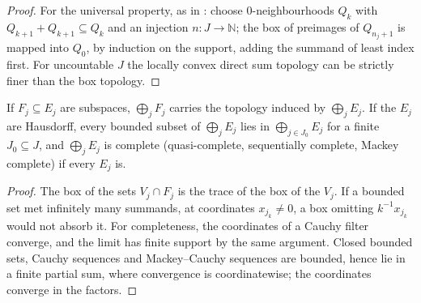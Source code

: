 \begin{proof}
  \leanok
  For the universal property, as in \cite[Lemma~B.13.2(a)]{GN26}: choose $0$-neighbourhoods $Q_k$
  with $Q_{k+1} + Q_{k+1} \subseteq Q_k$ and an injection $n \colon J \to \mathbb{N}$; the box of
  preimages of $Q_{n_j + 1}$ is mapped into $Q_0$, by induction on the support, adding the summand of
  least index first. For uncountable $J$ the locally convex direct sum topology can be strictly finer
  than the box topology.
\end{proof}

\begin{theorem}
  \label{thm:ds-subspaces}
  \leanok
  If $F_j \subseteq E_j$ are subspaces, $\bigoplus_j F_j$ carries the topology induced by
  $\bigoplus_j E_j$. If the $E_j$ are Hausdorff, every bounded subset of $\bigoplus_j E_j$ lies in
  $\bigoplus_{j \in J_0} E_j$ for a finite $J_0 \subseteq J$, and $\bigoplus_j E_j$ is complete
  (quasi-complete, sequentially complete, Mackey complete) if every $E_j$ is.
\end{theorem}

\begin{proof}
  \leanok
  The box of the sets $V_j \cap F_j$ is the trace of the box of the $V_j$. If a bounded set met
  infinitely many summands, at coordinates $x_{j_k} \neq 0$, a box omitting $k^{-1} x_{j_k}$ would
  not absorb it. For completeness, the coordinates of a Cauchy filter converge, and the limit has
  finite support by the same argument. Closed bounded sets, Cauchy sequences and Mackey--Cauchy
  sequences are bounded, hence lie in a finite partial sum, where convergence is coordinatewise;
  the coordinates converge in the factors.
\end{proof}

